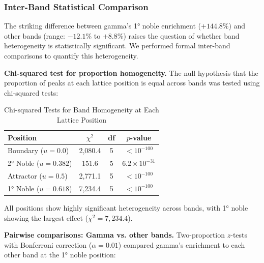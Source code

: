 \documentclass[11pt,a4paper]{article}
\begin{document}
\subsubsection{Inter-Band Statistical Comparison}

The striking difference between gamma's 1° noble enrichment ($+144.8\%$) and other bands (range: $-12.1\%$ to $+8.8\%$) raises the question of whether band heterogeneity is statistically significant. We performed formal inter-band comparisons to quantify this heterogeneity.

\textbf{Chi-squared test for proportion homogeneity.} The null hypothesis that the proportion of peaks at each lattice position is equal across bands was tested using chi-squared tests:

\begin{table}[H]
\centering
\caption{Chi-squared Tests for Band Homogeneity at Each Lattice Position}
\label{tab:band_chi2}
\begin{tabular}{@{}lccc@{}}
\toprule
Position & $\chi^2$ & df & $p$-value \\
\midrule
Boundary ($u = 0.0$) & 2,080.4 & 5 & $< 10^{-100}$ \\
2° Noble ($u = 0.382$) & 151.6 & 5 & $6.2 \times 10^{-31}$ \\
Attractor ($u = 0.5$) & 2,771.1 & 5 & $< 10^{-100}$ \\
1° Noble ($u = 0.618$) & 7,234.4 & 5 & $< 10^{-100}$ \\
\bottomrule
\end{tabular}
\end{table}

All positions show highly significant heterogeneity across bands, with 1° noble showing the largest effect ($\chi^2 = 7{,}234.4$).

\textbf{Pairwise comparisons: Gamma vs. other bands.} Two-proportion $z$-tests with Bonferroni correction ($\alpha = 0.01$) compared gamma's enrichment to each other band at the 1° noble position:
\end{document}
